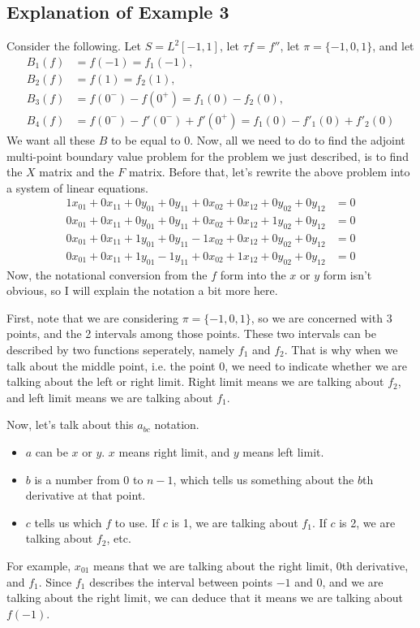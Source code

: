 \documentclass[11pt,reqno,oneside,a4paper]{article}
\begin{document}
   \subsection*{Explanation of Example 3}
   Consider the following. Let $S = L^2[-1,1]$, let $\tau f = f''$, let $\pi = \{-1,0,1\}$, and let
   \begin{align*}
   	  B_1(f) &= f(-1) = f_1(-1),\\
   	  B_2(f) &= f(1) = f_2(1),\\
   	  B_3(f) &= f(0^-)-f(0^+)=f_1(0) -f_2(0),\\
   	  B_4(f) &= f(0^-) -f'(0^-) +f'(0^+) = f_1(0) - f'_1(0) + f'_2(0)
   \end{align*}
   We want all these $B$ to be equal to 0. Now, all we need to do to find the adjoint multi-point boundary value problem for the problem we just described, is to find the $X$ matrix and the $F$ matrix. Before that, let's rewrite the above problem into a system of linear equations.
   \begin{align*}
   1x_{01} + 0x_{11} + 0y_{01} + 0y_{11} + 0x_{02}+ 0x_{12} + 0y_{02} + 0y_{12}  &= 0\\
   0x_{01} + 0x_{11} + 0y_{01} + 0y_{11} + 0x_{02} +0x_{12} + 1y_{02} + 0y_{12}  &= 0\\
   0x_{01} + 0x_{11} + 1y_{01} + 0y_{11} - 1x_{02}+ 0x_{12} + 0y_{02} + 0y_{12}  &= 0\\
   0x_{01} + 0x_{11} + 1y_{01} - 1y_{11} + 0x_{02}+ 1x_{12} + 0y_{02} + 0y_{12}  &= 0
   \end{align*}
   Now, the notational conversion from the $f$ form into the $x$ or $y$ form isn't obvious, so I will explain the notation a bit more here. 
   
   First, note that we are considering $\pi = \{-1,0,1\}$, so we are concerned with 3 points, and the 2 intervals among those points. These two intervals can be described by two functions seperately, namely $f_1$ and $f_2$. That is why when we talk about the middle point, i.e. the point 0, we need to indicate whether we are talking about the left or right limit. Right limit means we are talking about  $f_2$, and left limit means we are talking about $f_1$.
   
   Now, let's talk about this $a_{bc}$ notation.
   \begin{itemize}
   	\item $a$ can be $x$ or $y$. $x$ means right limit, and $y$ means left limit.
   	\item $b$ is a number from $0$ to $n-1$, which tells us something about the $b$th derivative at that point.
   	\item $c$ tells us which $f$ to use. If $c$ is 1, we are talking about $f_1$. If $c$ is 2, we are talking about $f_2$, etc.
   \end{itemize}
   For example, $x_{01}$ means that we are talking about the right limit, 0th derivative, and $f_1$. Since $f_1$ describes the interval between points $-1$ and 0, and we are talking about the right limit, we can deduce that it means we are talking about $f(-1)$.
   
\end{document}
